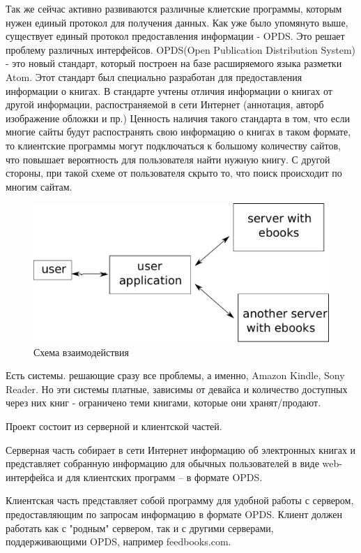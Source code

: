 \documentclass[a4paper]{report}
\begin{document}
Так же сейчас активно развиваются различные клиетские программы, которым нужен единый протокол для получения данных. Как уже было упомянуто выше, существует единый протокол предоставления информации - OPDS. Это решает проблему различных интерфейсов.
OPDS(Open Publication Distribution System) - это новый стандарт, который построен на базе расширяемого языка разметки Atom. Этот стандарт был специально разработан для предоставления информации о книгах. В стандарте учтены  отличия информации о книгах от другой информации, распостраняемой в сети Интернет (аннотация, авторб изображение обложки и пр.)
Ценность наличия такого стандарта в том, что если многие сайты будут распостранять свою информацию о книгах в таком формате, то клиентские программы могут подключаться к большому количеству сайтов, что повышает вероятность для пользователя найти нужную книгу. С другой стороны, при такой схеме от пользователя скрыто то, что поиск происходит по многим сайтам.

\begin{figure}
\centering
\includegraphics[width=.5\textwidth]{scheme}
\caption{Схема взаимодействия}\label{fig:scheme}
\end{figure}

Есть системы. решающие сразу все проблемы, а именно, Amazon Kindle, Sony Reader. %
Но эти системы платные, зависимы от девайса и количество доступных через них книг - ограничено теми книгами, которые они хранят/продают.



Проект состоит из серверной и клиентской частей.

Серверная часть собирает в сети Интернет информацию об электронных книгах и представляет собранную информацию для обычных пользователей в виде web-интерфейса и для клиентских программ -- в формате OPDS.

Клиентская часть представляет собой программу для удобной работы с сервером, предоставляющим по запросам информацию в формате OPDS. Клиент должен работать как с "родным" сервером, так и с другими серверами, поддерживающими OPDS, например feedbooks.com.
\end{document}
